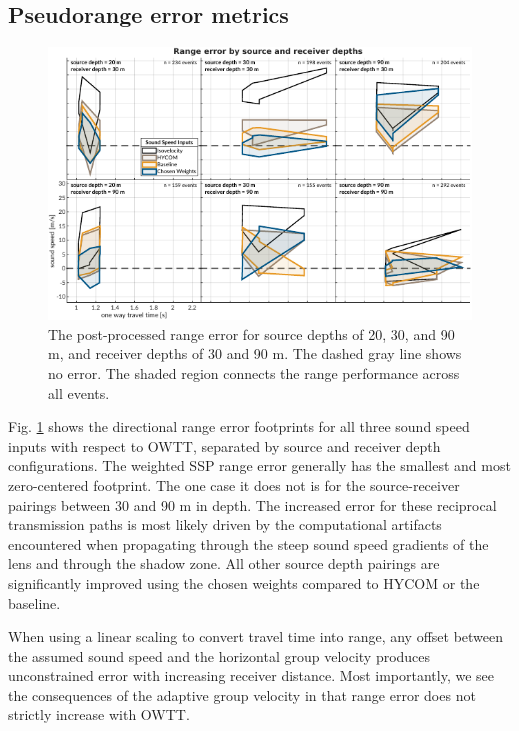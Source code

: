 \subsection{Pseudorange error metrics}

\begin{figure}[!ht]
\includegraphics[width=\textwidth]{figs/range-error-allMethods.pdf}
\caption{The post-processed range error for source depths of 20, 30, and 90 m, and receiver depths of 30 and 90 m. The dashed gray line shows no error. The shaded region connects the range performance across all events.}
\label{fig:rangeError}
\end{figure}

Fig. \ref{fig:rangeError} shows the directional range error footprints for all three sound speed inputs with respect to OWTT, separated by source and receiver depth configurations.
The weighted SSP range error generally has the smallest and most zero-centered footprint.
The one case it does not is for the source-receiver pairings between 30 and 90 m in depth.
The increased error for these reciprocal transmission paths is most likely driven by the computational artifacts encountered when propagating through the steep sound speed gradients of the lens and through the shadow zone.
All other source depth pairings are significantly improved using the chosen weights compared to HYCOM or the baseline.

When using a linear scaling to convert travel time into range, any offset between the assumed sound speed and the horizontal group velocity produces unconstrained error with increasing receiver distance.
Most importantly, we see the consequences of the adaptive group velocity in that range error does not strictly increase with OWTT.


